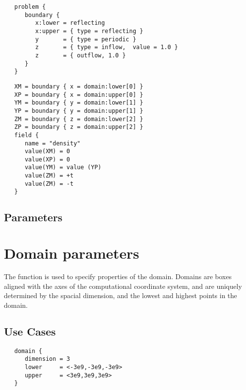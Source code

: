 \documentclass{book}
\begin{document}
\begin{verbatim}
   problem {
      boundary {
         x:lower = reflecting
         x:upper = { type = reflecting }
         y       = { type = periodic }
         z       = { type = inflow,  value = 1.0 }
         z       = { outflow, 1.0 }
      }
   }
\end{verbatim}

\begin{verbatim}
   XM = boundary { x = domain:lower[0] }
   XP = boundary { x = domain:upper[0] }
   YM = boundary { y = domain:lower[1] }
   YP = boundary { y = domain:upper[1] }
   ZM = boundary { z = domain:lower[2] }
   ZP = boundary { z = domain:upper[2] }
   field {
      name = "density"
      value(XM) = 0
      value(XP) = 0
      value(YM) = value (YP)
      value(ZM) = +t
      value(ZM) = -t
   }
\end{verbatim}

\subsection{Parameters}

\section{Domain parameters} \label{s:domain}

The  function is used to specify properties of the
domain.  Domains are boxes aligned with the axes of the computational
coordinate system, and are uniquely determined by the spacial
dimension, and the lowest and highest points in the domain.

\subsection{Use Cases}

\begin{verbatim}
   domain { 
      dimension = 3
      lower     = <-3e9,-3e9,-3e9>
      upper     = <3e9,3e9,3e9>
   }
\end{verbatim}
\end{document}
